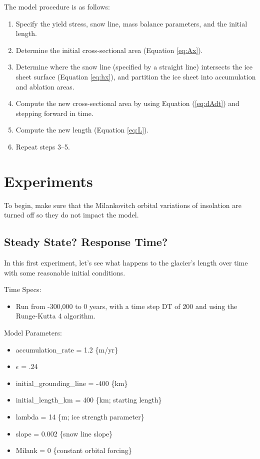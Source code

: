 \documentclass[11pt,letterpaper]{article}
\begin{document}
The model procedure is as follows:
\begin{enumerate}
\item Specify the yield stress, snow line, mass balance parameters, and the initial length.
\item Determine the initial cross-sectional area (Equation \ref{eq:Ax}).
\item Determine where the snow line (specified by a straight line) intersects the ice sheet surface (Equation \ref{eq:hx}), and partition the ice sheet into accumulation and ablation areas.
\item Compute the new cross-sectional area by using Equation (\ref{eq:dAdt}) and stepping forward in time.
\item Compute the new length (Equation \ref{eq:L}).
\item Repeat steps 3--5.
\end{enumerate}

\section{Experiments}

To begin, make sure that the Milankovitch orbital variations of insolation are turned off so they do not impact the model.

\subsection{Steady State?  Response Time?\label{model:initial}}
In this first experiment, let’s see what happens to the glacier’s length over time with some reasonable initial conditions.

Time Specs:
\begin{itemize}
\item Run from -300,000 to 0 years, with a time step DT of 200 and using the Runge-Kutta 4 algorithm.
\end{itemize}
Model Parameters:
\begin{itemize}
\item accumulation\_rate = 1.2 \{m/yr\}
\item $\epsilon$ =  .24
\item initial\_grounding\_line = -400 \{km\}
\item initial\_length\_km = 400 \{km; starting length\}
\item lambda = 14 \{m; ice strength parameter\}
\item slope = 0.002 \{snow line slope\}
\item Milank = 0 \{constant orbital forcing\}
\end{itemize}
\end{document}
